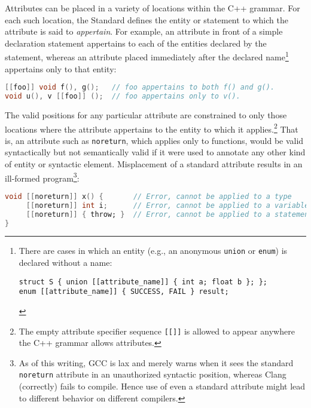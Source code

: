 Attributes can be placed in a variety of locations within the C++ grammar.  For each such location, the Standard defines the entity or statement to which the attribute is said to \emph{appertain}. For example, an attribute in front of a simple declaration statement appertains to each of the entities declared by the statement, whereas an attribute placed immediately after the declared name{\cprotect\footnote{There are cases in which an
entity (e.g., an anonymous \texttt{union} or \texttt{enum}) is
declared without a name:

\begin{lstlisting}[style=footcode]
struct S { union [[attribute_name]] { int a; float b }; };
enum [[attribute_name]] { SUCCESS, FAIL } result;
\end{lstlisting} \vspace*{-1ex}
      }} appertains only to that entity:

\begin{lstlisting}[language=C]
[[foo]] void f(), g();   // foo appertains to both f() and g().
void u(), v [[foo]] ();  // foo appertains only to v().
\end{lstlisting}

\noindent The valid positions for any particular attribute are constrained to only those locations
where the attribute appertains to the entity to which it applies.\footnote{The empty attribute specifier sequence \lstinline![[]]! is allowed to appear anywhere the C++ grammar allows attributes.}  That is, an attribute such as \lstinline!noreturn!,
which applies only to functions, would be valid syntactically but not semantically valid if it were used to annotate
any other kind of entity or syntactic element.  Misplacement of a standard attribute results
in an ill-formed program{\cprotect\footnote{As of this writing, GCC is lax and merely
warns when it sees the standard \texttt{noreturn} attribute in an
unauthorized syntactic position, whereas Clang (correctly) fails to
compile. Hence use of even a standard attribute might
  lead to different behavior on different compilers.}}:

\begin{lstlisting}[language=C]
void [[noreturn]] x() {       // Error, cannot be applied to a type
     [[noreturn]] int i;      // Error, cannot be applied to a variable
     [[noreturn]] { throw; }  // Error, cannot be applied to a statement
}
\end{lstlisting}

